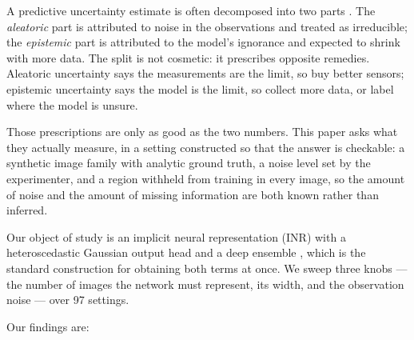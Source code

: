 \documentclass[10pt]{article}
\begin{document}
A predictive uncertainty estimate is often decomposed into two parts
\citep{kendall2017,hullermeier2021}. The \emph{aleatoric} part is attributed to noise in the
observations and treated as irreducible; the \emph{epistemic} part is attributed to the
model's ignorance and expected to shrink with more data. The split is not cosmetic: it
prescribes opposite remedies. Aleatoric uncertainty says the measurements are the limit, so
buy better sensors; epistemic uncertainty says the model is the limit, so collect more data,
or label where the model is unsure.

Those prescriptions are only as good as the two numbers. This paper asks what they actually
measure, in a setting constructed so that the answer is checkable: a synthetic image family
with analytic ground truth, a noise level set by the experimenter, and a region withheld from
training in every image, so the amount of noise and the amount of missing information are
both known rather than inferred.

Our object of study is an implicit neural representation (INR) \citep{mildenhall2020,
sitzmann2020, tancik2020} with a heteroscedastic Gaussian output head \citep{nix1994,
kendall2017} and a deep ensemble \citep{lakshminarayanan2017}, which is the standard
construction for obtaining both terms at once. We sweep three knobs --- the number of images
the network must represent, its width, and the observation noise --- over 97 settings.

Our findings are:
\end{document}

